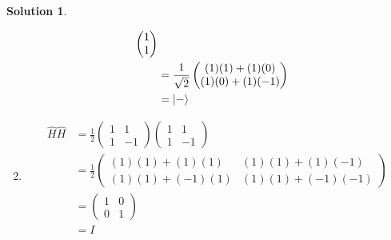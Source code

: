 \documentclass[10pt]{article}
\theoremstyle{definition}
\newtheorem{soln}{Solution}
\begin{document}
\begin{soln}
\begin{enumerate}[label=(\alph*)]
\begin{align*}
\begin{pmatrix}
              1 \\
              1
            \end{pmatrix}             \\
                           & =
            \frac{1}{\sqrt{2}}
            \begin{pmatrix}
              (1)(1)+(1)(0) \\
              (1)(0)+(1)(-1)
            \end{pmatrix}             \\
                           & = \ket{-}
          \end{align*}
    \item \begin{align*}
            \hat{H}\hat{H} & =
            \frac{1}{2}
            \begin{pmatrix}
              1 & 1  \\
              1 & -1
            \end{pmatrix}
            \begin{pmatrix}
              1 & 1  \\
              1 & -1
            \end{pmatrix}                    \\
                           & =
            \frac{1}{2}
            \begin{pmatrix}
              (1)(1)+(1)(1)  & (1)(1) +(1)(-1)  \\
              (1)(1)+(-1)(1) & (1)(1) +(-1)(-1)
            \end{pmatrix} \\
                           & =
            \begin{pmatrix}
              1 & 0 \\
              0 & 1
            \end{pmatrix}                    \\
                           & = I
          \end{align*}
  \end{enumerate}
\end{soln}
\end{document}
